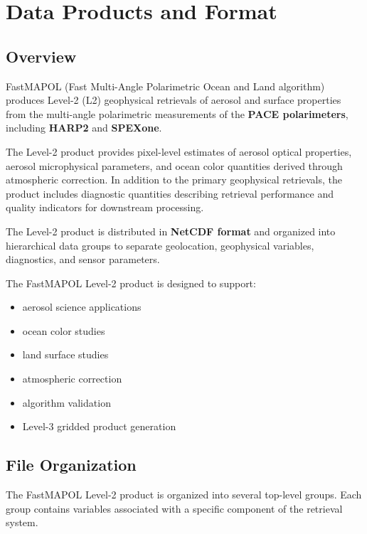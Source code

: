 \documentclass[
  11pt,
  letterpaper,
]{scrreprt}
\providecommand{\tightlist}{%
  \setlength{\itemsep}{0pt}\setlength{\parskip}{0pt}}
\begin{document}

\chapter{Data Products and Format}\label{sec-data-format}

\section{Overview}\label{overview}

FastMAPOL (Fast Multi-Angle Polarimetric Ocean and Land algorithm)
produces Level-2 (L2) geophysical retrievals of aerosol and surface
properties from the multi-angle polarimetric measurements of the
\textbf{PACE polarimeters}, including \textbf{HARP2} and
\textbf{SPEXone}.

The Level-2 product provides pixel-level estimates of aerosol optical
properties, aerosol microphysical parameters, and ocean color quantities
derived through atmospheric correction. In addition to the primary
geophysical retrievals, the product includes diagnostic quantities
describing retrieval performance and quality indicators for downstream
processing.

The Level-2 product is distributed in \textbf{NetCDF format} and
organized into hierarchical data groups to separate geolocation,
geophysical variables, diagnostics, and sensor parameters.

The FastMAPOL Level-2 product is designed to support:

\begin{itemize}
\tightlist
\item
  aerosol science applications
\item
  ocean color studies
\item
  land surface studies
\item
  atmospheric correction
\item
  algorithm validation
\item
  Level-3 gridded product generation
\end{itemize}

\section{File Organization}\label{file-organization}

The FastMAPOL Level-2 product is organized into several top-level
groups. Each group contains variables associated with a specific
component of the retrieval system.
\end{document}
